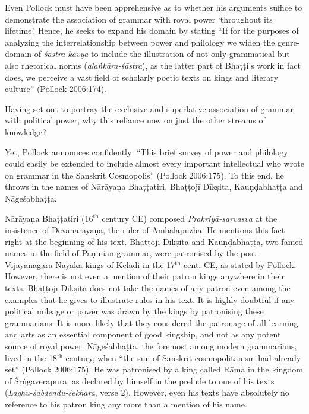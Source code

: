 Even Pollock must have been apprehensive as to whether his arguments suffice to demonstrate the association of grammar with royal power `throughout its lifetime'. Hence, he seeks to expand his domain by stating ``If for the purposes of analyzing the interrelationship between power and philology we widen the genre-domain of {\sl śāstra-kāvya} to include the illustration of not only grammatical but also rhetorical norms ({\sl alaṅkāra-śāstra}), as the latter part of Bhaṭṭi's work in fact does, we perceive a vast field of scholarly poetic texts on kings and literary culture'' (Pollock 2006:174). 

Having set out to portray the exclusive and superlative association of grammar with political power, why this reliance now on just the other streams of knowledge?

Yet, Pollock announces confidently:  ``This brief survey of power and philology could easily be extended to include almost every important intellectual who wrote on grammar in the Sanskrit Cosmopolis'' (Pollock 2006:175). To this end, he throws in the names of Nārāyaṇa Bhaṭṭatiri, Bhaṭṭojī Dīkṣita, Kauṇḍabhaṭṭa and Nāgeśabhaṭṭa.

Nārāyaṇa Bhaṭṭatiri (16$^{\text{th}}$ century CE) composed {\sl Prakriyā-sarvasva} at the insistence of Devanārāyaṇa, the ruler of Ambalapuzha. He mentions this fact right at the beginning of his text. Bhaṭṭojī Dīkṣita and Kauṇḍabhaṭṭa, two famed names in the field of Pāṇinian grammar, were patronised by the post-Vijayanagara Nāyaka kings of Keladi in the 17$^{\text{th}}$ cent. CE, as stated by Pollock. However, there is not even a mention of their patron kings anywhere in their texts. Bhaṭṭojī Dīkṣita does not take the names of any patron even among the examples that he gives to illustrate rules in his text. It is highly doubtful if any political mileage or power was drawn by the kings by patronising these grammarians. It is more likely that they considered the patronage of all learning and arts as an essential component of good kingship, and not as any potent source of royal power. Nāgeśabhaṭṭa, the foremost among modern grammarians, lived in the 18$^{\text{th}}$ century, when ``the sun of Sanskrit cosmopolitanism had already set'' (Pollock 2006:175). He was patronised by a king called Rāma in the kingdom of Śṛṅgaverapura, as declared by himself in the prelude to one of his texts ({\sl Laghu-śabdendu-śekhara}, verse 2). However, even his texts have absolutely no reference to his patron king any more than a mention of his name.

